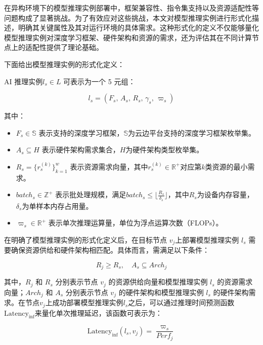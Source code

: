 在异构环境下的模型推理实例部署中，框架兼容性、指令集支持以及资源适配性等问题构成了显著挑战。为了有效应对这些挑战，本文对模型推理实例进行形式化描述，明确其关键属性及其对运行环境的具体需求。这种形式化的定义不仅能够量化模型推理实例对深度学习框架、硬件架构和资源的需求，还为评估其在不同计算节点上的适配性提供了理论基础。

下面给出模型推理实例的形式化定义：

\begin{definition}[模型推理实例] 
\label{def:aimodel}
AI 推理实例$l_s \in L$ 可表示为一个 5 元组：
\end{definition}

$$
l_s = (F_s,\, A_s,\, R_s,\, \gamma_s,\, \varpi_s)
$$

其中：
\begin{itemize}
    \item $F_s \in \mathbb{S}$ 表示支持的深度学习框架，$\mathbb{S}$为云边平台支持的深度学习框架枚举集。
    \item $A_s \subseteq H$ 表示硬件架构需求集合，$H$为硬件架构类型枚举集。
    \item $R_s = \{r^{(k)}_s\}_{k=1}^w$ 表示资源需求向量，其中$r^{(k)}_s \in \mathbb{R}^+$对应第$k$类资源的最小需求。
    \item $batch_s \in \mathbb{Z}^+$ 表示批处理规模，满足$batch_s \leq \lfloor \frac{R_s}{\delta_s} \rfloor$，其中$R_s$为设备内存容量，$\delta_s$为单样本内存占用量。
    \item $\varpi_s \in \mathbb{R}^+$ 表示单次推理运算量，单位为浮点运算次数（FLOPs）。
\end{itemize}

在明确了模型推理实例的形式化定义后，在目标节点 $v_j$上部署模型推理实例 $l_s$ 需要确保资源供给和硬件架构相匹配。具体而言，需满足以下条件：

\begin{equation}
R_j \geq R_s, \quad A_s \subseteq Arch_j
\end{equation}

其中，$R_j$ 和 $R_s$ 分别表示节点 $v_j$ 的资源供给向量和模型推理实例 $l_s$ 的资源需求向量；$Arch_j$ 和 $A_s$ 分别表示节点 $v_j$ 的硬件架构和模型推理实例 $l_s$ 的硬件架构需求。在节点$v_j$上成功部署模型推理实例$l_s$之后，可以通过推理时间预测函数$\text{Latency}_{\text{inf}}$来量化单次推理延迟，该函数可表示为：

\begin{equation}
\text{Latency}_{\text{inf}}(l_s, v_j)= \frac{\varpi_s}{Perf_j}
\end{equation}

